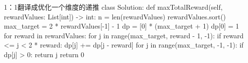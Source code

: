 \begin{frame}[fragile]          %
  
  \begin{codeblock}[language=python]{1：1翻译成优化一个维度的递推}
class Solution:
    def maxTotalReward(self, rewardValues: List[int]) -> int:
        n = len(rewardValues)
        rewardValues.sort()
        max_target = 2 * rewardValues[-1] - 1
        dp = [0] * (max_target + 1)
        dp[0] = 1
        for reward in rewardValues:
            for j in range(max_target, reward - 1, -1):
                if reward <= j < 2 * reward:
                    dp[j] += dp[j - reward]
        for j in range(max_target, -1, -1):
            if dp[j] > 0:
                return j
        return 0
  \end{codeblock}
\end{frame}



